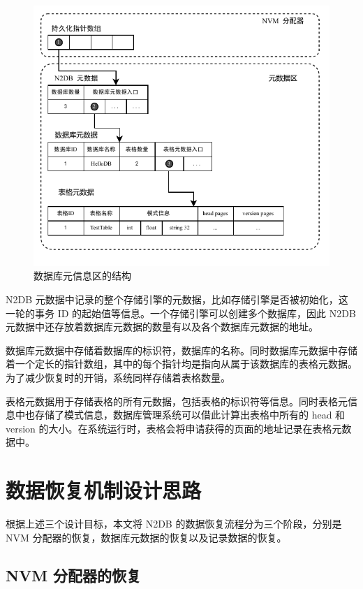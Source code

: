\begin{figure}
    \centering
    \includegraphics[width=1\linewidth]{figures/catalog.pdf}
    \caption{数据库元信息区的结构}
    \label{fig:catalog}
\end{figure}

N2DB 元数据中记录的整个存储引擎的元数据，比如存储引擎是否被初始化，这一轮的事务 ID 的起始值等信息。一个存储引擎可以创建多个数据库，因此 N2DB 元数据中还存放着数据库元数据的数量有以及各个数据库元数据的地址。

数据库元数据中存储着数据库的标识符，数据库的名称。同时数据库元数据中存储着一个定长的指针数组，其中的每个指针均是指向从属于该数据库的表格元数据。为了减少恢复时的开销，系统同样存储着表格数量。


表格元数据用于存储表格的所有元数据，包括表格的标识符等信息。同时表格元信息中也存储了模式信息，数据库管理系统可以借此计算出表格中所有的 head 和 version 的大小。在系统运行时，表格会将申请获得的页面的地址记录在表格元数据中。




\section{数据恢复机制设计思路}

根据上述三个设计目标，本文将 N2DB 的数据恢复流程分为三个阶段，分别是 NVM 分配器的恢复，数据库元数据的恢复以及记录数据的恢复。

\subsection{NVM 分配器的恢复}
\label{ssec:allocator-recovery}

